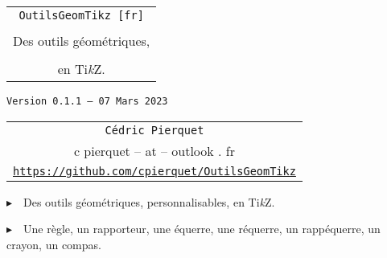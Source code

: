 \documentclass[french,a4paper,11pt]{article}
\def\TPversion{0.1.1}
\def\TPdate{07 Mars 2023}
\begin{document}
\setlength{\aweboxleftmargin}{0.07\linewidth}
\setlength{\aweboxcontentwidth}{0.93\linewidth}
\setlength{\aweboxvskip}{8pt}

\thispagestyle{empty}

\vspace{2cm}

\begin{center}
	\begin{minipage}{0.75\linewidth}
	\begin{tcolorbox}[colframe=yellow,colback=yellow!15]
		\begin{center}
			\begin{tabular}{c}
				{\Huge \texttt{OutilsGeomTikz [fr]}}\\
				\\
				{\LARGE Des outils géométriques, } \\
				\\
				{\LARGE en Ti\textit{k}Z}. \\
			\end{tabular}
			
			\bigskip
			
			{\small \texttt{Version \TPversion{} -- \TPdate}}
		\end{center}
	\end{tcolorbox}
\end{minipage}
\end{center}

\begin{center}
	\begin{tabular}{c}
	\texttt{Cédric Pierquet}\\
	{\ttfamily c pierquet -- at -- outlook . fr}\\
	\texttt{\url{https://github.com/cpierquet/OutilsGeomTikz}}
\end{tabular}
\end{center}

\vspace{0.25cm}

{$\blacktriangleright$~~Des outils géométriques, personnalisables, en Ti\textit{k}Z.}

\smallskip

{$\blacktriangleright$~~Une règle, un rapporteur, une équerre, une réquerre, un rappéquerre, un crayon, un compas.}

\vspace{0.5cm}
\end{document}
